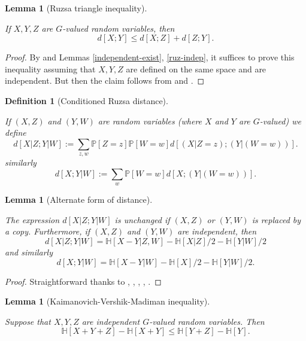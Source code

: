 \documentclass[10pt,a4paper]{article}
\newtheorem{lemma}[theorem]{Lemma}
\newtheorem{definition}[theorem]{Definition}
\newcommand{\lean}[1]{}
\newcommand{\uses}[1]{}
\newcommand{\leanok}{}
\newcommand{\bbH}{\mathbb{H}}
\newcommand{\bbP}{\mathbb{P}}
\begin{document}
\begin{lemma}[Ruzsa triangle inequality]
  \label{ruzsa-triangle}
  \lean{rdist_triangle}
  \leanok
  If $X,Y,Z$ are $G$-valued random variables, then
$$ d[X ;Y] \leq d[X ;Z] + d[Z;Y].$$
\end{lemma}

\begin{proof}\uses{ruz-copy, ruz-indep, independent-exist, ruzsa-triangle-improved}\leanok By  and Lemmas \ref{independent-exist}, \ref{ruz-indep}, it suffices to prove this inequality assuming that $X,Y,Z$ are defined on the same space and are independent.  But then the claim follows from  and .
\end{proof}

\begin{definition}[Conditioned Ruzsa distance]\label{cond-dist-def}
  \uses{ruz-dist-def}
  \lean{condRuzsaDist}\leanok
If $(X, Z)$ and $(Y, W)$ are random variables (where $X$ and $Y$ are $G$-valued) we define
$$ d[X  | Z; Y | W] := \sum_{z,w}  \bbP[Z=z]  \bbP[W=w] d[(X|Z=z); (Y|(W=w))].$$
similarly
$$ d[X ; Y | W] := \sum_{w}  \bbP[W=w] d[X ; (Y|(W=w))].$$
\end{definition}

\begin{lemma}[Alternate form of distance]\label{cond-dist-alt}
\lean{condRuzsaDist_of_copy, condRuzsaDist'_of_copy, condRuzsaDist_of_indep, condRuzsaDist'_of_indep}\leanok
  The expression $d[X  | Z;Y | W]$ is unchanged if $(X,Z)$ or $(Y,W)$ is replaced by a copy.  Furthermore, if $(X,Z)$ and $(Y,W)$ are independent, then
$$  d[X  | Z;Y | W] = \bbH[X-Y|Z,W] - \bbH[X|Z]/2 - \bbH[Y|W]/2$$
and similarly
$$  d[X ;Y | W] = \bbH[X-Y|W] - \bbH[X]/2 - \bbH[Y|W]/2.$$
\end{lemma}

\begin{proof}\uses{copy-ent, ruz-copy, ruz-indep, cond-dist-def, conditional-entropy-def}\leanok Straightforward thanks to , , , , .
\end{proof}

\begin{lemma}[Kaimanovich-Vershik-Madiman inequality]\label{kv}
  \lean{kaimanovich_vershik}\leanok
Suppose that $X, Y, Z$ are independent $G$-valued random variables. Then
\[
  \bbH[X + Y + Z] - \bbH[X + Y] \leq \bbH[Y+ Z] - \bbH[Y].
\]
\end{lemma}
\end{document}
